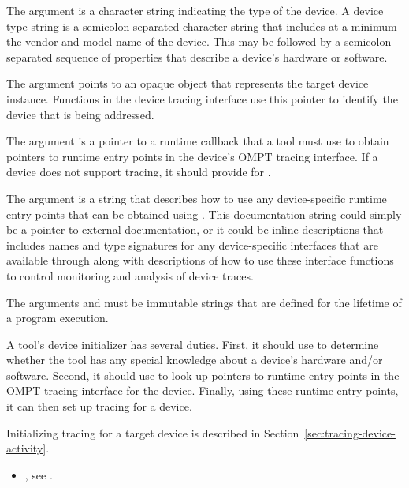 The argument  is a character string indicating the
type of the device. A device type string is a semicolon separated
character string that includes at a minimum the vendor and model name
of the device. This may be followed by a semicolon-separated sequence
of properties that describe a device's hardware or software.

The  argument points to an opaque object that represents 
the target device instance. Functions in the device tracing interface 
use this pointer to identify the device that is being addressed.

The argument  is a pointer to a runtime callback
that a tool must use to obtain pointers to runtime entry points in the
device's OMPT tracing interface. If a device does not support tracing,
it should provide  for .

The argument  is a string that describes
how to use any device-specific runtime
entry points that can be obtained using . This
documentation string could simply be a pointer to external
documentation, or it could be inline descriptions
that includes names and type signatures for any
device-specific interfaces that are available through 
along with descriptions of how to use these interface functions to
control monitoring and analysis of device traces.

\constraints
The arguments  and  must be
immutable strings that are defined for the lifetime of a program
execution.

\effect

A tool's device initializer has several duties.  First, it should use
 to determine whether the tool has any special knowledge
about a device's hardware and/or software.  Second, it should use
 to look up pointers to runtime entry points in the OMPT tracing
interface for the device.  Finally, using these runtime entry points, it can
then set up tracing for a device.

Initializing tracing for a target device is described in 
Section~\ref{sec:tracing-device-activity}.

\crossreferences
\begin{itemize}
\item {}, see
  .
\end{itemize}


\label{sec:ompt_callback_device_finalize_t}

